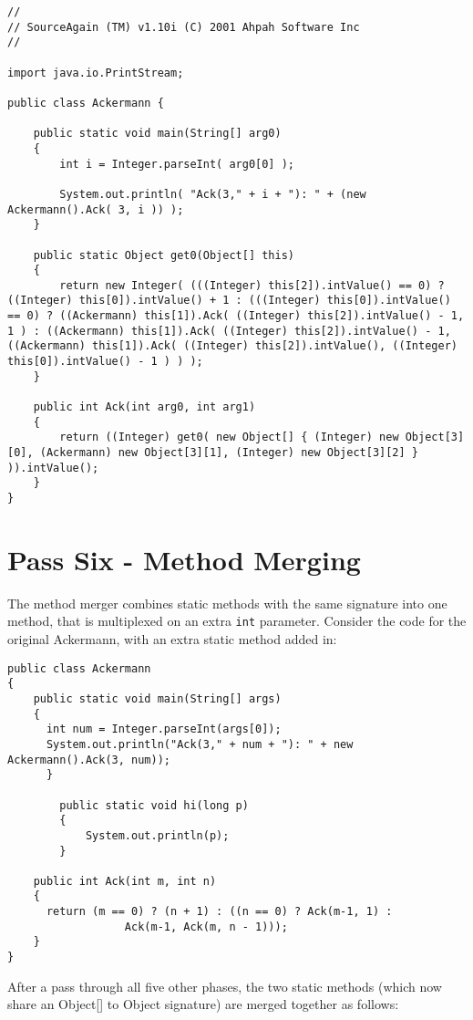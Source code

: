 \begin{verbatim}
// 
// SourceAgain (TM) v1.10i (C) 2001 Ahpah Software Inc
// 

import java.io.PrintStream;

public class Ackermann {

    public static void main(String[] arg0)
    {
        int i = Integer.parseInt( arg0[0] );

        System.out.println( "Ack(3," + i + "): " + (new Ackermann().Ack( 3, i )) );
    }

    public static Object get0(Object[] this)
    {
        return new Integer( (((Integer) this[2]).intValue() == 0) ? ((Integer) this[0]).intValue() + 1 : (((Integer) this[0]).intValue() == 0) ? ((Ackermann) this[1]).Ack( ((Integer) this[2]).intValue() - 1, 1 ) : ((Ackermann) this[1]).Ack( ((Integer) this[2]).intValue() - 1, ((Ackermann) this[1]).Ack( ((Integer) this[2]).intValue(), ((Integer) this[0]).intValue() - 1 ) ) );
    }

    public int Ack(int arg0, int arg1)
    {
        return ((Integer) get0( new Object[] { (Integer) new Object[3][0], (Ackermann) new Object[3][1], (Integer) new Object[3][2] } )).intValue();
    }
}
\end{verbatim}

\section{Pass Six - Method Merging}
The method merger combines static methods with the same signature into one method, that is multiplexed on an extra
\verb/int/ parameter.  Consider the code for the original Ackermann, with an extra static method added in:
\begin{verbatim}
public class Ackermann 
{
    public static void main(String[] args) 
    {
      int num = Integer.parseInt(args[0]);
      System.out.println("Ack(3," + num + "): " + new Ackermann().Ack(3, num));
      }
    
		public static void hi(long p)
		{
			System.out.println(p);
		}

    public int Ack(int m, int n) 
    {
      return (m == 0) ? (n + 1) : ((n == 0) ? Ack(m-1, 1) :
                  Ack(m-1, Ack(m, n - 1)));
    }
}
\end{verbatim}
After a pass through all five other phases, the two static methods (which now share an Object[] to Object signature)
are merged together as follows:

